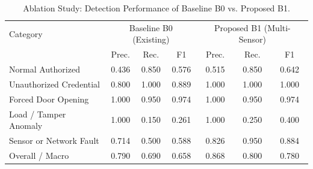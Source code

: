 \begin{table}[!htbp]
\renewcommand{\arraystretch}{1.02}
\centering
\small
\caption{Ablation Study: Detection Performance of Baseline B0 vs. Proposed B1.}
\label{tab:b0_vs_b1}
\vspace{4pt}
\begin{tabular}{l ccc ccc}
\hline
Category & \multicolumn{3}{c}{Baseline B0 (Existing)} & \multicolumn{3}{c}{Proposed B1 (Multi-Sensor)} \\
 & Prec. & Rec. & F1 & Prec. & Rec. & F1 \\
\hline
\rule{0pt}{2.6ex}Normal Authorized & 0.436 & 0.850 & 0.576 & 0.515 & 0.850 & 0.642 \\
Unauthorized Credential & 0.800 & 1.000 & 0.889 & 1.000 & 1.000 & 1.000 \\
Forced Door Opening & 1.000 & 0.950 & 0.974 & 1.000 & 0.950 & 0.974 \\
Load / Tamper Anomaly & 1.000 & 0.150 & 0.261 & 1.000 & 0.250 & 0.400 \\
Sensor or Network Fault & 0.714 & 0.500 & 0.588 & 0.826 & 0.950 & 0.884 \\
\hline
\rule{0pt}{2.6ex}Overall / Macro & 0.790 & 0.690 & 0.658 & 0.868 & 0.800 & 0.780 \\
\hline
\end{tabular}
\end{table}
